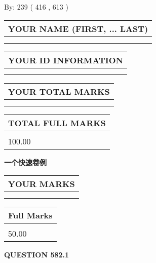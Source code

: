 \documentclass{ctexart}
\begin{document}
   
\hspace{1.0in} By: 
 239 ( 416 ,  613 )
   
   
   
   
\newpage 
\setcounter{page}{ 
   582001 } 
   
   
   
   
\noindent\begin{tabular}{|l|}
\hline
YOUR NAME (FIRST, ... LAST)  \\
\hline
 \\ 
 \\ 
\hline
\end{tabular}
\hspace{0.05in} \begin{tabular}{|l|}
\hline
 YOUR   ID   INFORMATION  \\
\hline
 \\ 
 \\ 
\hline
\end{tabular}
   
   
\vspace{0.2in}\noindent\begin{tabular}{|l|}
\hline
YOUR TOTAL MARKS  \\
\hline
 \\ 
 \\ 
\hline
\end{tabular}
\hspace{0.05in} \begin{tabular}{|l|}
\hline
TOTAL FULL MARKS  \\
\hline
 \\ 
100.00 \\
\hline
\end{tabular}
   
   
 \vspace{0.2in}
{\LARGE {\textbf{ 一个快速卷例}}}
   
   
  
\vspace{0.2in}
  
\noindent\begin{tabular}{|l|}
\hline
 YOUR MARKS  \\
\hline
 \\ 
 \\ 
\hline
\end{tabular}
\hspace{0.05in} \begin{tabular}{|l|}
\hline
 Full Marks  \\
\hline
 \\ 
50.00 \\
\hline
\end{tabular}
{\textbf{\Large{QUESTION
582.1 
}}}
  
\end{document}
